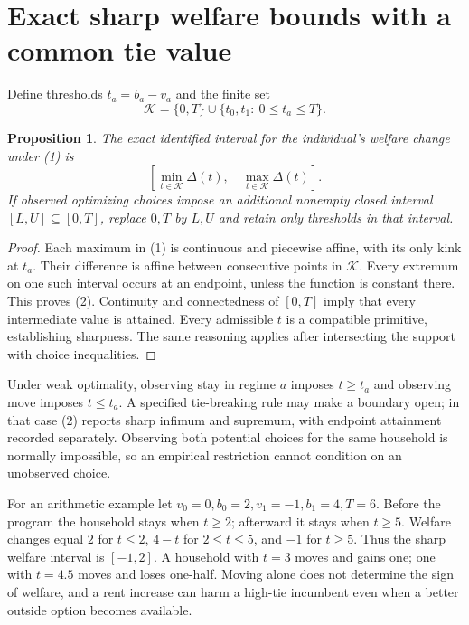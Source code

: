 \documentclass[11pt,a4paper]{article}
\newtheorem{proposition}[theorem]{Proposition}
\begin{document}
\section{Exact sharp welfare bounds with a common tie value}
Define thresholds $t_a=b_a-v_a$ and the finite set
\[
 \mathcal K=\{0,T\}\cup\{t_0,t_1:\ 0\le t_a\le T\}.
\]
\begin{proposition}
The exact identified interval for the individual's welfare change under (1) is
\[
 [\min_{t\in\mathcal K}\Delta(t),\quad\max_{t\in\mathcal K}\Delta(t)]. \tag{2}
\]
If observed optimizing choices impose an additional nonempty closed interval $[L,U]\subseteq[0,T]$, replace $0,T$ by $L,U$ and retain only thresholds in that interval.
\end{proposition}
\begin{proof}
Each maximum in (1) is continuous and piecewise affine, with its only kink at $t_a$. Their difference is affine between consecutive points in $\mathcal K$. Every extremum on one such interval occurs at an endpoint, unless the function is constant there. This proves (2). Continuity and connectedness of $[0,T]$ imply that every intermediate value is attained. Every admissible $t$ is a compatible primitive, establishing sharpness. The same reasoning applies after intersecting the support with choice inequalities.
\end{proof}
Under weak optimality, observing stay in regime $a$ imposes $t\ge t_a$ and observing move imposes $t\le t_a$. A specified tie-breaking rule may make a boundary open; in that case (2) reports sharp infimum and supremum, with endpoint attainment recorded separately. Observing both potential choices for the same household is normally impossible, so an empirical restriction cannot condition on an unobserved choice.

For an arithmetic example let $v_0=0,b_0=2,v_1=-1,b_1=4,T=6$. Before the program the household stays when $t\ge2$; afterward it stays when $t\ge5$. Welfare changes equal $2$ for $t\le2$, $4-t$ for $2\le t\le5$, and $-1$ for $t\ge5$. Thus the sharp welfare interval is $[-1,2]$. A household with $t=3$ moves and gains one; one with $t=4.5$ moves and loses one-half. Moving alone does not determine the sign of welfare, and a rent increase can harm a high-tie incumbent even when a better outside option becomes available.
\end{document}
